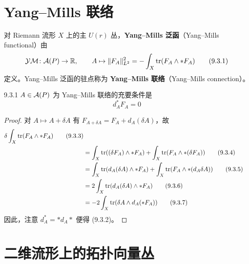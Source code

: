 
\section{Yang--Mills 联络}

对 Riemann 流形 $X$ 上的主 $U(r)$ 丛，\textbf{Yang--Mills 泛函}（Yang--Mills functional）由
\begin{equation}
  \mathcal{YM}\colon \mathcal{A}(P) \to \mathbb{R},\qquad
  A \mapsto \|F_A\|^2_{L^2} = -\int_X \operatorname{tr}(F_A\wedge *F_A)
  \tag{9.3.1}
\end{equation}
定义。Yang--Mills 泛函的驻点称为 \textbf{Yang--Mills 联络}（Yang--Mills connection）。

\begin{theorem*}{9.3.1}
$A\in\mathcal{A}(P)$ 为 Yang--Mills 联络的充要条件是
\begin{equation}
  d_A^* F_A = 0
  \tag{9.3.2}
\end{equation}
\end{theorem*}

\begin{proof}
对 $A\mapsto A+\delta A$ 有 $F_{A+\delta A} = F_A + d_A(\delta A)$，故
\begin{align}
  \delta\int_X \operatorname{tr}(F_A\wedge *F_A)
  \tag{9.3.3}\\
  &= \int_X \operatorname{tr}((\delta F_A)\wedge *F_A) + \int_X \operatorname{tr}(F_A\wedge *(\delta F_A))
  \tag{9.3.4}\\
  &= \int_X \operatorname{tr}(d_A(\delta A)\wedge *F_A) + \int_X \operatorname{tr}(F_A\wedge *(d_A\delta A))
  \tag{9.3.5}\\
  &= 2\int_X \operatorname{tr}(d_A(\delta A)\wedge *F_A)
  \tag{9.3.6}\\
  &= -2\int_X \operatorname{tr}(\delta A\wedge d_A(*F_A))
  \tag{9.3.7}
\end{align}
因此，注意 $d_A^* = *d_A *$ 便得 (9.3.2)。
\end{proof}



\section{二维流形上的拓扑向量丛}

